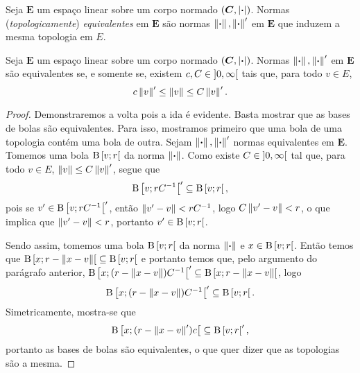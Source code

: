 \begin{definition}
Seja $\bm E$ um espaço linear sobre um corpo normado $(\bm C,\left\vert{\bm{\cdot}}\right\vert)$. Normas (\emph{topologicamente}) \emph{equivalentes} em $\bm E$ são normas $\left\Vert{\bm{\cdot}}\right\Vert, \left\Vert{\bm{\cdot}}\right\Vert'$ em $\bm E$ que induzem a mesma topologia em $E$.
\end{definition}

\begin{proposition}
Seja $\bm E$ um espaço linear sobre um corpo normado $(\bm C,\left\vert{\bm{\cdot}}\right\vert)$. Normas $\left\Vert{\bm{\cdot}}\right\Vert, \left\Vert{\bm{\cdot}}\right\Vert'$ em $\bm E$ são equivalentes se, e somente se, existem $c,C \in \left]{0},{\infty}\right[$ tais que, para todo $v \in E$,
	\begin{equation*}
	c \left\Vert{v}\right\Vert' \leq \left\Vert{v}\right\Vert \leq C \left\Vert{v}\right\Vert'.
	\end{equation*}
\end{proposition}
\begin{proof}
Demonstraremos a volta pois a ida é evidente.
Basta mostrar que as bases de bolas são equivalentes. Para isso, mostramos primeiro que uma bola de uma topologia contém uma bola de outra. Sejam $\left\Vert{\bm{\cdot}}\right\Vert, \left\Vert{\bm{\cdot}}\right\Vert'$ normas equivalentes em $\bm E$. Tomemos uma bola $\mathrm{B}\left[{v};{r}\right[$ da norma $\left\Vert{\bm{\cdot}}\right\Vert$. Como existe $C \in \left]{0},{\infty}\right[$ tal que, para todo $v \in E$, $\left\Vert{v}\right\Vert \leq C \left\Vert{v}\right\Vert'$, segue que
	\begin{equation*}
	\mathrm{B}\left[{v};{rC^{-1}}\right[' \subseteq \mathrm{B}\left[{v};{r}\right[,
	\end{equation*}
pois se $v' \in \mathrm{B}\left[{v};{rC^{-1}}\right['$, então $\left\Vert{v'-v}\right\Vert < rC^{-1}$, logo $C\left\Vert{v'-v}\right\Vert < r$, o que implica que $\left\Vert{v'-v}\right\Vert < r$, portanto $v' \in \mathrm{B}\left[{v};{r}\right[$.

Sendo assim, tomemos uma bola $\mathrm{B}\left[{v};{r}\right[$ da norma $\left\Vert{\bm{\cdot}}\right\Vert$ e $x \in \mathrm{B}\left[{v};{r}\right[$. Então temos que $\mathrm{B}\left[{x};{r-\left\Vert{x-v}\right\Vert}\right[ \subseteq \mathrm{B}\left[{v};{r}\right[$
e portanto temos que, pelo argumento do parágrafo anterior, $\mathrm{B}\left[{x};{(r-\left\Vert{x-v}\right\Vert)C^{-1}}\right[' \subseteq \mathrm{B}\left[{x};{r-\left\Vert{x-v}\right\Vert}\right[$, logo
	\begin{equation*}
	\mathrm{B}\left[{x};{(r-\left\Vert{x-v}\right\Vert)C^{-1}}\right[' \subseteq \mathrm{B}\left[{v};{r}\right[.
	\end{equation*}
Simetricamente, mostra-se que
	\begin{equation*}
	\mathrm{B}\left[{x};{(r-\left\Vert{x-v}\right\Vert')c}\right[ \subseteq \mathrm{B}\left[{v};{r}\right[',
	\end{equation*}
portanto as bases de bolas são equivalentes, o que quer dizer que as topologias são a mesma.
\end{proof}




